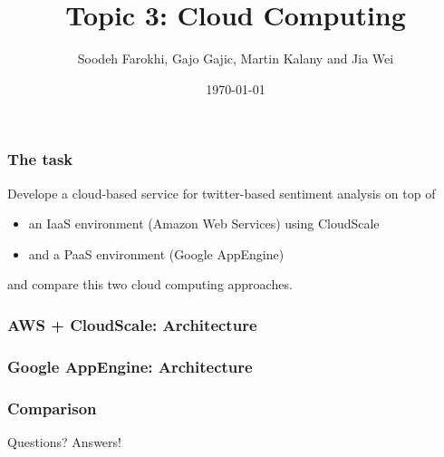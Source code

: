 \documentclass{beamer}
\title{Topic 3: Cloud Computing}
\author{Soodeh Farokhi, Gajo Gajic, Martin Kalany and Jia Wei}
\date{\today}
\newcommand\fG[1]{\textcolor{green!80!black}{#1}}
\newcommand\fR[1]{\textcolor{red!80!black}{#1}}
\begin{document}
\frame{\titlepage}

\begin{frame}
\frametitle{The task}

Develope a cloud-based service for twitter-based sentiment analysis on top of
\begin{itemize}
\item an IaaS environment (Amazon Web Services) using CloudScale
\item and a PaaS environment (Google AppEngine)
\end{itemize}

and compare this two cloud computing approaches.

\end{frame}
  
\begin{frame}
\frametitle{AWS + CloudScale: Architecture}
\end{frame}

\begin{frame}
\frametitle{Google AppEngine: Architecture}
\end{frame}

\begin{frame}
\frametitle{Comparison}
\end{frame}

\begin{frame}
\fR{Questions?} \fG{Answers!}
\end{frame}
\end{document}
